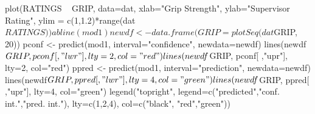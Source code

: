 \begin{Schunk}
\begin{Sinput}
 plot(RATINGS ~ GRIP, data=dat, xlab="Grip Strength", ylab="Supervisor Rating", ylim = c(1,1.2)*range(dat$RATINGS))
 abline(mod1)
 newdf <- data.frame(GRIP=plotSeq(dat$GRIP, 20))
 pconf <- predict(mod1, interval="confidence", newdata=newdf)
 lines(newdf$GRIP, pconf[ ,"lwr"], lty=2, col="red")
 lines(newdf$GRIP, pconf[ ,"upr"], lty=2, col="red")
 ppred <- predict(mod1, interval="prediction", newdata=newdf)
 lines(newdf$GRIP, ppred[ ,"lwr"], lty=4, col="green")
 lines(newdf$GRIP, ppred[ ,"upr"], lty=4, col="green")
 legend("topright", legend=c("predicted","conf. int.","pred. int."), lty=c(1,2,4), col=c("black", "red","green"))
\end{Sinput}
\end{Schunk}
